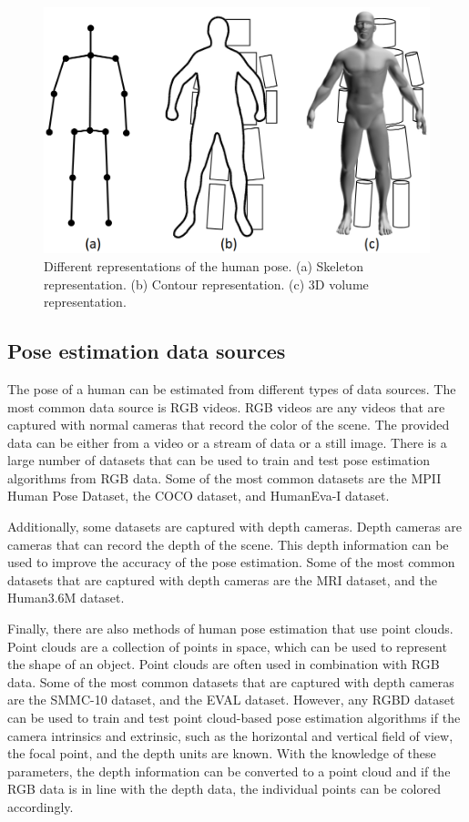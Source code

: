 \begin{figure}
    \centering
    \includegraphics[width=0.8\linewidth]{figures/HPE/PoseRepresentation.png}
    \caption{Different representations of the human pose. (a) Skeleton representation. (b) Contour representation. (c) 3D volume representation. \cite{HPESurveyOriginal}}
    \label{fig:pose_representation}
\end{figure}

\subsection{Pose estimation data sources}

The pose of a human can be estimated from different types of data sources. The most common data source is RGB videos. RGB videos are any videos that are captured with normal cameras that record the color of the scene. The provided data can be either from a video or a stream of data or a still image. There is a large number of datasets that can be used to train and test pose estimation algorithms from RGB data. Some of the most common datasets are the MPII Human Pose Dataset\cite{MPII}, the COCO dataset\cite{Coco}, and HumanEva-I dataset\cite{HumanEva}.

Additionally, some datasets are captured with depth cameras. Depth cameras are cameras that can record the depth of the scene. This depth information can be used to improve the accuracy of the pose estimation. Some of the most common datasets that are captured with depth cameras are the MRI dataset\cite{mRI}, and the Human3.6M dataset\cite{h36m_pami}.

Finally, there are also methods of human pose estimation that use point clouds. Point clouds are a collection of points in space, which can be used to represent the shape of an object. Point clouds are often used in combination with RGB data. Some of the most common datasets that are captured with depth cameras are the SMMC-10 dataset\cite{SMMC10}, and the EVAL dataset\cite{EVAL}. However, any RGBD dataset can be used to train and test point cloud-based pose estimation algorithms if the camera intrinsics and extrinsic, such as the horizontal and vertical field of view, the focal point, and the depth units are known. With the knowledge of these parameters, the depth information can be converted to a point cloud and if the RGB data is in line with the depth data, the individual points can be colored accordingly.


